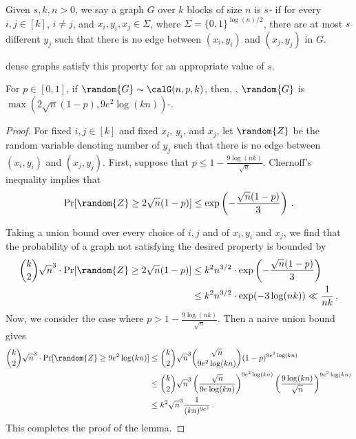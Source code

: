 \begin{definition}\label{def:neighbor-dense}

Given $s,k,n > 0$, we say a graph $G$ over $k$ blocks of size $n$ is \emph{$s$-\ndense} if for every $i,j\in [k]$, $i\neq j$,  
and $x_i,y_i, x_j \in \Sigma$, where $\Sigma = \{0,1\}^{\log (n)/2}$, there are at most $s$ different $y_j$ such that there is no edge between $(x_i,y_i)$ and $(x_j,y_j)$ in $G$.
\end{definition}
  dense graphs \aas satisfy this property for an appropriate value of $s$. 

\begin{lemma}
    \label{lemma:probability-concentrates}
    For $p \in [0,1]$, if $\random{G} \sim  \calG(n,p,k)$, then, \aas, $\random{G}$ is $\max(2\sqrt{n}(1-p),9e^2\log(kn))$-\ndense.
\end{lemma}

{}{
\begin{proof}
    For fixed 
    $i,j\in [k]$
    and fixed $x_i$, $y_i$, and $x_j$, let $\random{Z}$ be the random variable denoting number of $y_j$ such that there is no edge between $(x_i,y_i)$ and $(x_j,y_j)$. First, suppose that $p\leq1-\frac{9\log(nk)}{\sqrt n}$. Chernoff's inequality implies that 
    \begin{equation*}
        \Pr[\random{Z}\geq2\sqrt{n}(1-p)] \leq \exp\left ( -\frac{\sqrt{n}(1-p)}{3}\right)\,. 
    \end{equation*}

    Taking a union bound over every choice of $i,j$ and of $x_i,y_i$ and $x_j$,
    we find that the probability of a graph not satisfying the desired property is bounded by 
    \begin{align*}
        \binom{k}{2}\sqrt{n}^3 \cdot 
        \Pr[\random{Z}\geq 
        2\sqrt{n}(1-p)] &\leq k^2 n^{3/2} \cdot \exp\left (- \frac{\sqrt{n}(1-p)}{3}\right)
        \\
        &\leq k^2n^{3/2}\cdot \exp(-3\log(nk))\ll \frac{1}{nk}\,. 
    \end{align*}
    Now, we consider the case where $p > 1-\frac{9\log(nk)}{\sqrt n}$. Then a naive union bound gives
    \begin{align*}
         \binom{k}{2}\sqrt{n}^3 \cdot 
         \Pr[\random{Z}\geq 
         9e^2\log(kn)] &\leq 
         \binom{k}{2}\sqrt{n}^3 
         \binom{\sqrt n}{9e^2\log(kn)}
         (1-p)^{9e^2\log(kn)}\\
         &\leq \binom{k}{2}\sqrt{n}^3 
         \left(\frac{\sqrt n}
         {9e\log(kn)}\right)^{9e^2\log(kn)}
         \left(\frac{9\log(kn)}
         {\sqrt n}\right)^{9e^2\log(kn)}\\
         &\leq k^2 \sqrt{n}^3 \frac{1}{(kn)^{9e^2}}\,. 
    \end{align*}
    This completes the proof of the lemma.
\end{proof}
}

